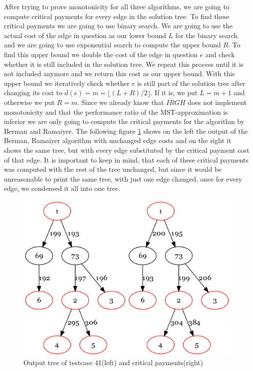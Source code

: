 After trying to prove monotonicity for all three algorithms, we are going to compute critical payments for every edge in the solution tree. To find these critical payments we are going to use binary search. We are going to use the actual cost of the edge in question as our lower bound $L$ for the binary search and we are going to use exponential search to compute the upper bound $R$. 
To find this upper bound we double the cost of the edge in question $e$ and check whether it is still included in the solution tree. We repeat this process until it is not included anymore and we return this cost as our upper bound. With this upper bound we iteratively check whether $e$ is still part of the solution tree after changing its cost to $d(e)=m=\lfloor (L+R)/2\rfloor$. If it is, we put $L=m+1$ and otherwise we put $R=m$. Since we already know that $IRGH$ does not implement monotonicity and that the performance ratio of the MST-approximation is inferior we are only going to compute the critical payments for the algorithm by Berman and Ramaiyer. The following figure \ref{fig:crit41} shows on the left the output of the Berman, Ramaiyer algorithm with unchanged edge costs and on the right it shows the same tree, but with every edge substituted by the critical payment cost of that edge. It is important to keep in mind, that each of these critical payments was computed with the rest of the tree unchanged, but since it would be unreasonable to print the same tree, with just one edge changed, once for every edge, we condensed it all into one tree. 

\begin{figure}[h]
\centering
\includegraphics[scale=0.25]{figures/crit.png}
\caption{Output tree of testcase 41(left) and critical payments(right)}\label{fig:crit41}
\end{figure}
 
